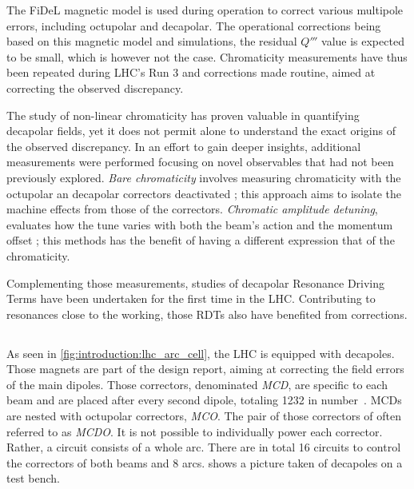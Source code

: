The FiDeL magnetic model is used during operation to correct various multipole errors, including
octupolar and decapolar. The operational corrections being based on this magnetic model and
simulations, the residual $Q'''$ value is expected to be small, which is however not the case.
Chromaticity measurements have thus been repeated during LHC's Run 3 and corrections made routine,
aimed at correcting the observed discrepancy.

The study of non-linear chromaticity has proven valuable in quantifying decapolar fields, yet it
does not permit alone to understand the exact origins of the observed discrepancy. In an effort to
gain deeper insights, additional measurements were performed focusing on novel observables that had
not been previously explored.
\textit{Bare chromaticity} involves measuring chromaticity with
the octupolar an decapolar correctors deactivated ; this approach aims to isolate the machine
effects from those of the correctors.
\textit{Chromatic amplitude detuning}, evaluates how the tune varies with both the beam's action and
the momentum offset ; this methods has the benefit of having a different expression that of the
chromaticity.

Complementing those measurements, studies of decapolar Resonance Driving Terms have been undertaken
for the first time in the LHC. Contributing to resonances close to the working, those RDTs also have
benefited from corrections.


\subsection{}

As seen in \cref{fig:introduction:lhc_arc_cell}, the LHC is equipped with decapoles. Those magnets
are part of the design report, aiming at correcting the field errors of the main dipoles.
Those correctors, denominated \textit{MCD}, are specific to each beam and are placed after every
second dipole, totaling 1232 in number~\cite{venturini_delsolaro_magnetic_2005}.
MCDs are nested with octupolar correctors, \textit{MCO}. The pair of those correctors of often
referred to as \textit{MCDO}. 
It is not possible to individually power each corrector. Rather, a circuit consists of a whole arc.
There are in total 16 circuits to control the correctors of both beams and 8 arcs.
 shows a picture taken of decapoles on a test bench.

